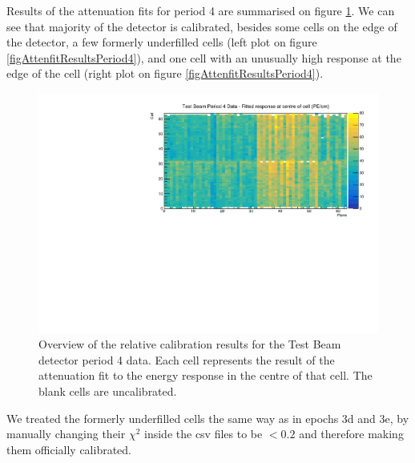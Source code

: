\documentclass[12pt,a4paper]{article}
\begin{document}
Results of the attenuation fits for period 4 are summarised on figure \ref{figCellCentreResponsePeriod4}. We can see that majority of the detector is calibrated, besides some cells on the edge of the detector, a few formerly underfilled cells (left plot on figure \ref{figAttenfitResultsPeriod4}), and one cell with an unusually high response at the edge of the cell (right plot on figure \ref{figAttenfitResultsPeriod4}).

\begin{figure}[!hbtp]
\centering
\includegraphics[width=\textwidth]{Plots/CellResponseAtCentre_period4_Limited.pdf}
\caption{Overview of the relative calibration results for the Test Beam detector period 4 data. Each cell represents the result of the attenuation fit to the energy response in the centre of that cell. The blank cells are uncalibrated.}
\label{figCellCentreResponsePeriod4}
\end{figure}

We treated the formerly underfilled cells the same way as in epochs 3d and 3e, by manually changing their $\chi^2$ inside the csv files to be $<0.2$ and therefore making them officially calibrated.
\end{document}
